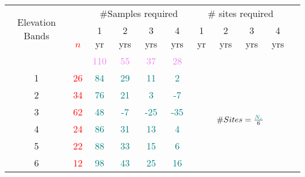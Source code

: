 \begin{table}\scriptsize
\centering
\begin{tabular}{cccccc|ccccc}
\toprule
 \multirow{2}{1cm}{Elevation Bands}  &                                  &   \multicolumn{4}{c}{ \#Samples required} & \multicolumn{4}{c}{\# sites required} \\ \cline{3-10}\noalign{\smallskip}
\multicolumn{1}{c}{}&\multirow{2}{.3cm}{\textcolor{red}{$n$}}  & 1 yr  & 2 yrs   & 3 yrs    & 4 yrs                   & 1 yr   & 2 yrs  & 3 yrs  & 4 yrs\\ 
						&		           &\textcolor{violet}{110} &\textcolor{violet}{55} &\textcolor{violet}{37} &\textcolor{violet}{28}&&&&&\\ \midrule
1                                                                   &\textcolor{red}{26}&    \textcolor{teal}{84}   & \textcolor{teal}{29}       & \textcolor{teal}{11}        & \textcolor{teal}{2}                         & \multicolumn{4}{c}{\multirow{6}{*}{\large$\#Sites = {\textcolor{teal}{N_c} \over 6}$}}  \\ 
2                                                                      &\textcolor{red}{34}& \textcolor{teal}{76} & \textcolor{teal}{21} & \textcolor{teal}{3}     & \textcolor{teal}{-7}                                    &\multicolumn{4}{c}{}    \\ 
3                                                                      &\textcolor{red}{62}&  \textcolor{teal}{48} & \textcolor{teal}{-7}  & \textcolor{teal}{-25} &\textcolor{teal}{ -35}                                  & \multicolumn{4}{c}{}   \\
4                                                                      &\textcolor{red}{24}&  \textcolor{teal}{86} & \textcolor{teal}{31} & \textcolor{teal}{13}  & \textcolor{teal}{4}                                      & \multicolumn{4}{c}{}   \\ 
5                                                                      &\textcolor{red}{22}&  \textcolor{teal}{88} & \textcolor{teal}{33} & \textcolor{teal}{15}  & \textcolor{teal}{6}                                      &\multicolumn{4}{c}{}   \\ 
6                                                                     &\textcolor{red}{12}&  \textcolor{teal}{98} & \textcolor{teal}{43} & \textcolor{teal}{25}  & \textcolor{teal}{16}                                     & \multicolumn{4}{c}{}   \\ \bottomrule
\end{tabular}
\label{tab:WQapsenario}
\end{table}
